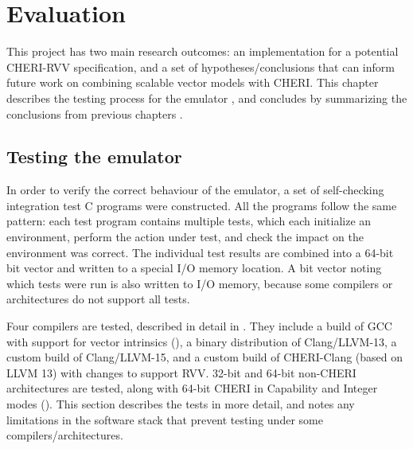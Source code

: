 \chapter{Evaluation\label{chap:eval}}
This project has two main research outcomes: an implementation for a potential CHERI-RVV specification, and a set of hypotheses/conclusions that can inform future work on combining scalable vector models with CHERI.
This chapter describes the testing process for the emulator \todoref{}, and concludes by summarizing the conclusions from previous chapters \todoref{}.

\section{Testing the emulator}
In order to verify the correct behaviour of the emulator, a set of self-checking integration test C programs were constructed.
All the programs follow the same pattern: each test program contains multiple tests, which each initialize an environment, perform the action under test, and check the impact on the environment was correct.
The individual test results are combined into a 64-bit bit vector and written to a special I/O memory location.
A bit vector noting which tests were run is also written to I/O memory, because some compilers or architectures do not support all tests.

Four compilers are tested, described in detail in .
They include a build of GCC with support for vector intrinsics (), a binary distribution of Clang/LLVM-13, a custom build of Clang/LLVM-15, and a custom build of CHERI-Clang (based on LLVM 13) with changes to support RVV.
32-bit and 64-bit non-CHERI architectures are tested, along with 64-bit CHERI in Capability and Integer modes ().
This section describes the tests in more detail, and notes any limitations in the software stack that prevent testing under some compilers/architectures.


